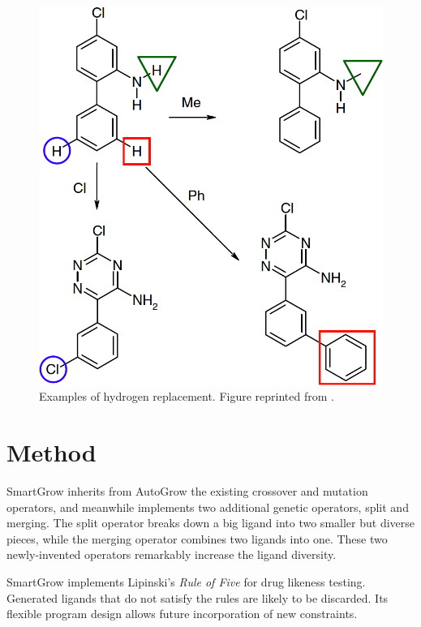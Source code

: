 \begin{figure}
\centering
\includegraphics[width=\textwidth]{LigandSynthesis/Figures/Methods/HydrogenReplacement.png}
\caption{Examples of hydrogen replacement. Figure reprinted from \citep{325-2009}.}
\label{fig:HydrogenReplacement}
\end{figure}

\section{Method}

SmartGrow inherits from AutoGrow the existing crossover and mutation operators, and meanwhile implements two additional genetic operators, split and merging. The split operator breaks down a big ligand into two smaller but diverse pieces, while the merging operator combines two ligands into one. These two newly-invented operators remarkably increase the ligand diversity.

SmartGrow implements Lipinski's \textit{Rule of Five} \citep{169-1997,167-2000,168-2004} for drug likeness testing. Generated ligands that do not satisfy the rules are likely to be discarded. Its flexible program design allows future incorporation of new constraints.

